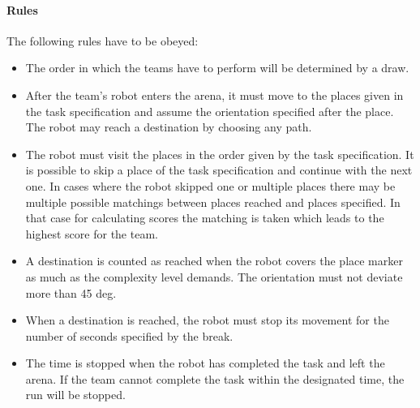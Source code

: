 \paragraph{Rules}
The following rules have to be obeyed:

\begin{itemize}
\item The order in which the teams have to perform will be determined by a draw.
\item After the team's robot enters the arena, it must move to the places given in the task specification and assume the orientation specified after the place. The robot may reach a destination by choosing any path.
\item The robot must visit the places in the order given by the task specification. It is possible to skip a place of the task specification and continue with the next one. In cases where the robot skipped one or multiple places there may be multiple possible matchings between places reached and places specified. In that case for calculating scores the matching is taken which leads to the highest score for the team.
\item A destination is counted as reached when the robot covers the place marker as much as the complexity level demands. The orientation must not deviate more than 45 deg.
\item When a destination is reached, the robot must stop its movement for the number of seconds specified by the break.
\item The time is stopped when the robot has completed the task and left the arena. If the team cannot complete the task within the designated time, the run will be stopped.
\end{itemize}
%
%
%
%
